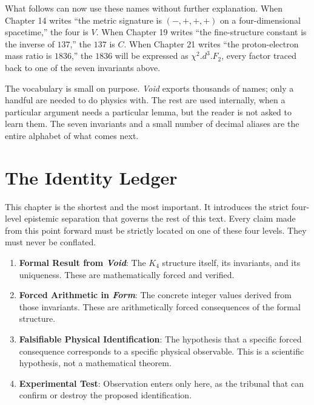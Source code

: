 \documentclass[11pt,a4paper]{book}
\def\cdot{.}%
\begin{document}
What follows can now use these names without further explanation. When Chapter 14 writes ``the metric signature is $(-,+,+,+)$ on a four-dimensional spacetime,'' the four is $V$. When Chapter 19 writes ``the fine-structure constant is the inverse of $137$,'' the $137$ is $C$. When Chapter 21 writes ``the proton-electron mass ratio is $1836$,'' the $1836$ will be expressed as $\chi^2 \cdot d^3 \cdot F_2$, every factor traced back to one of the seven invariants above.

The vocabulary is small on purpose. \textit{Void} exports thousands of names; only a handful are needed to do physics with. The rest are used internally, when a particular argument needs a particular lemma, but the reader is not asked to learn them. The seven invariants and a small number of decimal aliases are the entire alphabet of what comes next.



\chapter{The Identity Ledger}
\label{ch:identity-ledger}

This chapter is the shortest and the most important. It introduces the strict four-level epistemic separation that governs the rest of this text. Every claim made from this point forward must be strictly located on one of these four levels. They must never be conflated.

\begin{enumerate}
\item \textbf{Formal Result from \textit{Void}}: The $K_4$ structure itself, its invariants, and its uniqueness. These are mathematically forced and verified.
\item \textbf{Forced Arithmetic in \textit{Form}}: The concrete integer values derived from those invariants. These are arithmetically forced consequences of the formal structure.
\item \textbf{Falsifiable Physical Identification}: The hypothesis that a specific forced consequence corresponds to a specific physical observable. This is a scientific hypothesis, not a mathematical theorem.
\item \textbf{Experimental Test}: Observation enters only here, as the tribunal that can confirm or destroy the proposed identification.
\end{enumerate}
\end{document}

